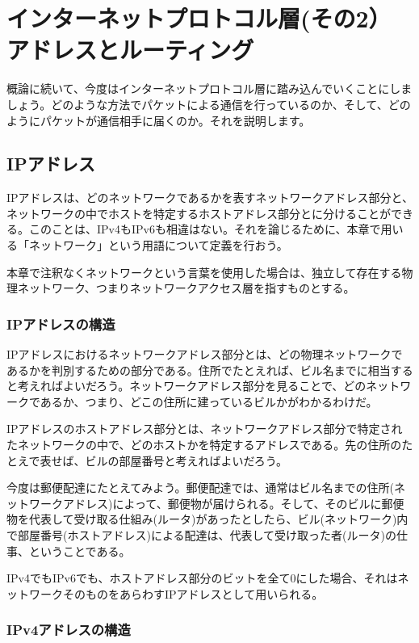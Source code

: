 \chapter{インターネットプロトコル層(その2） アドレスとルーティング}

概論に続いて、今度はインターネットプロトコル層に踏み込んでいくことにしましょう。どのような方法でパケットによる通信を行っているのか、そして、どのようにパケットが通信相手に届くのか。それを説明します。


\section{IPアドレス}

IPアドレスは、どのネットワークであるかを表すネットワークアドレス部分と、ネットワークの中でホストを特定するホストアドレス部分とに分けることができる。このことは、IPv4もIPv6も相違はない。それを論じるために、本章で用いる「ネットワーク」という用語について定義を行おう。

本章で注釈なくネットワークという言葉を使用した場合は、独立して存在する物理ネットワーク、つまりネットワークアクセス層を指すものとする。

\subsection{IPアドレスの構造}

IPアドレスにおけるネットワークアドレス部分とは、どの物理ネットワークであるかを判別するための部分である。住所でたとえれば、ビル名までに相当すると考えればよいだろう。ネットワークアドレス部分を見ることで、どのネットワークであるか、つまり、どこの住所に建っているビルかがわかるわけだ。

IPアドレスのホストアドレス部分とは、ネットワークアドレス部分で特定されたネットワークの中で、どのホストかを特定するアドレスである。先の住所のたとえで表せば、ビルの部屋番号と考えればよいだろう。

今度は郵便配達にたとえてみよう。郵便配達では、通常はビル名までの住所(ネットワークアドレス)によって、郵便物が届けられる。そして、そのビルに郵便物を代表して受け取る仕組み(ルータ)があったとしたら、ビル(ネットワーク)内で部屋番号(ホストアドレス)による配達は、代表して受け取った者(ルータ)の仕事、ということである。

IPv4でもIPv6でも、ホストアドレス部分のビットを全て0にした場合、それはネットワークそのものをあらわすIPアドレスとして用いられる。

\subsection{IPv4アドレスの構造}


